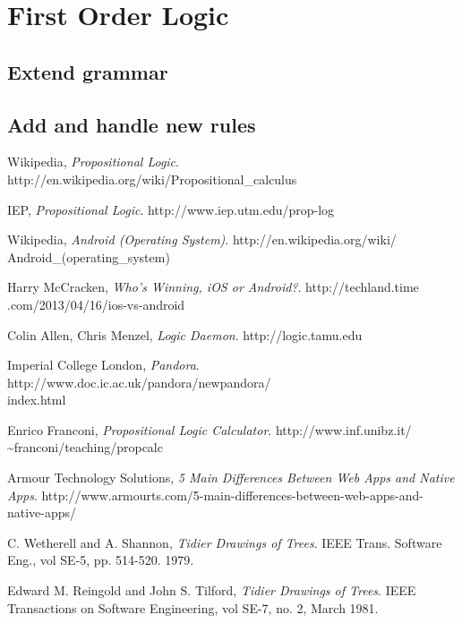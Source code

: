 \documentclass{report}
\begin{document}
\section{First Order Logic}
\subsection{Extend grammar}
\subsection{Add and handle new rules}

\begin{thebibliography}{9}

  Wikipedia,
  \emph{Propositional Logic}.
  http://en.wikipedia.org/wiki/Propositional\_calculus

  IEP,
  \emph{Propositional Logic}.
  http://www.iep.utm.edu/prop-log

  Wikipedia,
  \emph{Android (Operating System)}.
  http://en.wikipedia.org/wiki/\\Android\_(operating\_system)

  Harry McCracken,
  \emph{Who’s Winning, iOS or Android?}.
  http://techland.time\\.com/2013/04/16/ios-vs-android

  Colin Allen, Chris Menzel,
  \emph{Logic Daemon}.
  http://logic.tamu.edu

  Imperial College London,
  \emph{Pandora}.
  http://www.doc.ic.ac.uk/pandora/newpandora/\\index.html

  Enrico Franconi,
  \emph{Propositional Logic Calculator}.
  http://www.inf.unibz.it/\\\textasciitilde franconi/teaching/propcalc

  Armour Technology Solutions,
  \emph{5 Main Differences Between Web Apps and Native Apps}.
  http://www.armourts.com/5-main-differences-between-web-apps-and-native-apps/

  C. Wetherell and A. Shannon,
  \emph{Tidier Drawings of Trees}.
  IEEE Trans. Software Eng., 
  vol SE-5, pp. 514-520.
  1979.

  Edward M. Reingold and John S. Tilford,
  \emph{Tidier Drawings of Trees}.
  IEEE Transactions on Software Engineering, 
  vol SE-7, no. 2,
  March 1981.


\end{thebibliography}
\end{document}
